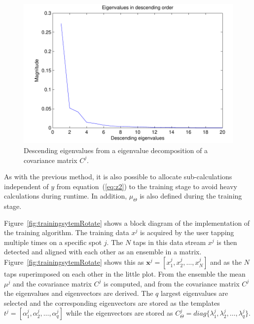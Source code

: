 \begin{figure}[!]
\centering
\includegraphics[width=120mm]{eigenvalues.pdf}
\caption{Descending eigenvalues from a eigenvalue decomposition of a covariance matrix $C^j$.}\label{fig:eigenvalues}
\end{figure}

As with the previous method, it is also possible to allocate sub-calculations independent of $y$ from equation~(\ref{eq:z2}) to the training stage to avoid heavy calculations during runtime. In addition, $\mu_\Theta$ is also defined during the training stage.

Figure~\ref{fig:trainingsytemRotate} shows a block diagram of the implementation of the training algorithm. The training data $x^j$ is acquired by the user tapping multiple times on a specific spot $j$. The $N$ taps in this data stream $x^j$ is then detected and aligned with each other as an ensemble in a matrix. Figure~\ref{fig:trainingsytemRotate} shows this as $\textbf{x}^j =  [ x_1^j, x_2^j, \ldots , x_N^j ] $ and as the $N$ taps superimposed on each other in the little plot. From the ensemble the mean $\mu^j$ and the covariance matrix $C^j$ is computed, and from the covariance matrix $C^j$ the eigenvalues and eigenvectors are derived. The $q$ largest eigenvalues are selected and the corresponding eigenvectors are stored as the templates $t^j = [\alpha^j_1,\alpha^j_2,\ldots,\alpha^j_q] $ while the eigenvectors are stored as $C_\Theta^j = diag\{\lambda_1^j,\lambda_2^j,\ldots,\lambda_q^j \}$.


